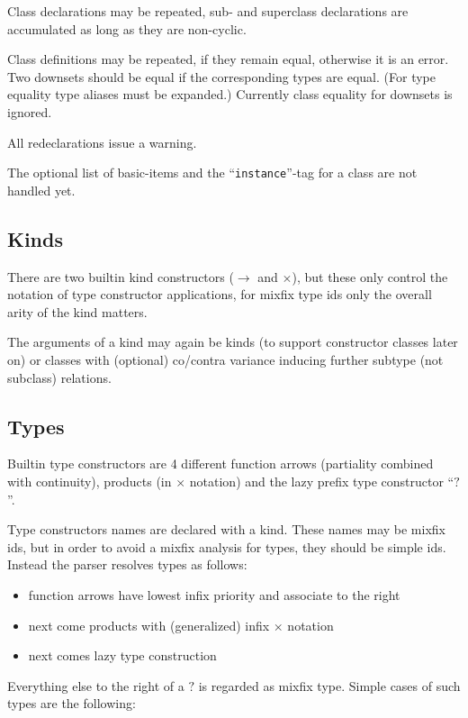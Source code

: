 \documentclass{article}
\begin{document}
Class declarations may be repeated, sub- and superclass declarations are
accumulated as long as they are non-cyclic.

Class definitions may be repeated, if they remain equal, otherwise it is an
error. Two downsets should be equal if the corresponding types are equal. (For
type equality type aliases must be expanded.) Currently class equality for
downsets is ignored.

All redeclarations issue a warning. 

The optional list of basic-items and the ``\texttt{instance}''-tag for a class
are not handled yet.

\subsection{Kinds}

There are two builtin kind constructors ($\to$ and $\times$), but these only
control the notation of type constructor applications, for mixfix type ids
only the overall arity of the kind matters. 

The arguments of a kind may again be kinds (to support constructor classes
later on) or classes with (optional) co/contra variance inducing further
subtype (not subclass) relations.

\subsection{Types}

Builtin type constructors are 4 different function arrows (partiality combined
with continuity), products (in $\times$ notation) and the lazy
prefix type constructor ``$?$''.

Type constructors names are declared with a kind. These names may be mixfix
ids, but in order to avoid a mixfix analysis for types, they should be
simple ids. Instead the parser resolves types as follows:

\begin{itemize}
\item function arrows have lowest infix priority and associate to the right
\item next come products with (generalized) infix $\times$ notation
\item next comes lazy type construction
\end{itemize}

Everything else to the right of a $?$ is regarded as mixfix type. Simple cases
of such types are the following:
\end{document}
